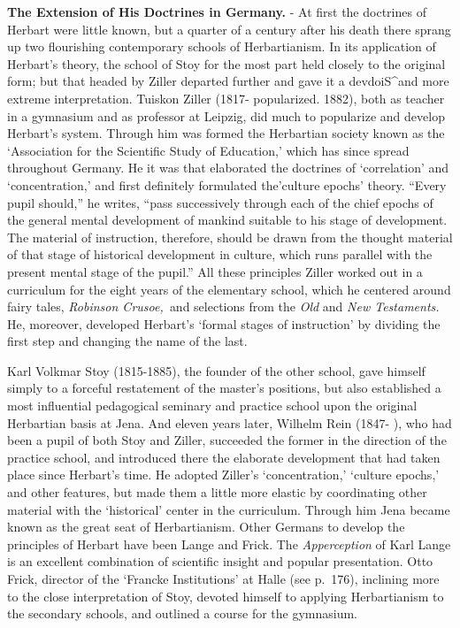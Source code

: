 \documentclass[]{book}
\begin{document}
\textbf{The Extension of His Doctrines in Germany.} - At first the doctrines of Herbart were little known, but a quarter of a century after his death there sprang up two flourishing contemporary schools of Herbartianism. In its application of Herbart's theory, the school of Stoy for the most part held closely to the original form; but that headed by Ziller departed further and gave it a devdoiS\^{}and more extreme interpretation. Tuiskon Ziller (1817- popularized. 1882), both as teacher in a gymnasium and as professor at Leipzig, did much to popularize and develop Herbart's system. Through him was formed the Herbartian society known as the `Association for the Scientific Study of Education,' which has since spread throughout Germany. He it was that elaborated the doctrines of `correlation' and `concentration,' and first definitely formulated the'culture epochs' theory. ``Every pupil should,'' he writes, ``pass successively through each of the chief epochs of the general mental development of mankind suitable to his stage of development. The material of instruction, therefore, should be drawn from the thought material of that stage of historical development in culture, which runs parallel with the present mental stage of the pupil.'' All these principles Ziller worked out in a curriculum for the eight years of the elementary school, which he centered around fairy tales, \emph{Robinson Crusoe,~}and selections from the \emph{Old} and \emph{New Testaments.} He, moreover, developed Herbart's `formal stages of instruction' by dividing the first step and changing the name of the last.

Karl Volkmar Stoy (1815-1885), the founder of the other school, gave himself simply to a forceful restatement of the master's positions, but also established a most influential pedagogical seminary and practice school upon the original Herbartian basis at Jena. And eleven years later, Wilhelm Rein (1847- ), who had been a pupil of both Stoy and Ziller, succeeded the former in the direction of the practice school, and introduced there the elaborate development that had taken place since Herbart's time. He adopted Ziller's `concentration,' `culture epochs,' and other features, but made them a little more elastic by coordinating other material with the `historical' center in the curriculum. Through him Jena became known as the great seat of Herbartianism. Other Germans to develop the principles of Herbart have been Lange and Frick. The \emph{Apperception} of Karl Lange is an excellent combination of scientific insight and popular presentation. Otto Frick, director of the `Francke Institutions' at Halle (see p.~176), inclining more to the close interpretation of Stoy, devoted himself to applying Herbartianism to the secondary schools, and outlined a course for the gymnasium.
\end{document}
